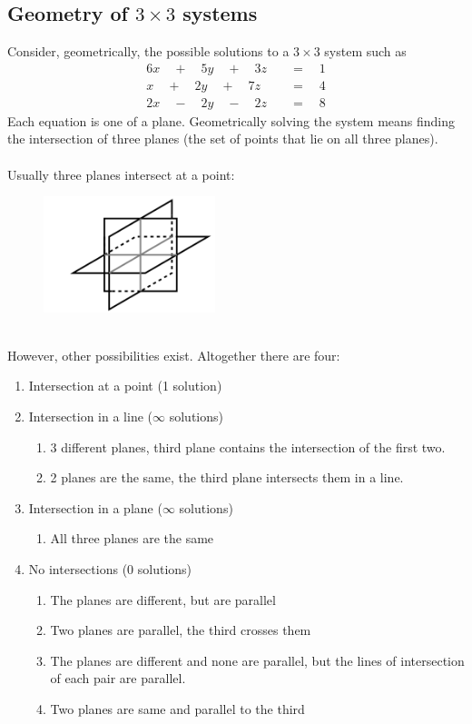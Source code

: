\documentclass{report}
\begin{document}
\subsection{Geometry of $3\times3$ systems} %
Consider, geometrically, the possible solutions to a $3\times3$ system such as
\begin{align*}
6x\quad+\quad5y\quad+\quad3z\quad&=\quad1\\
x\quad+\quad2y\quad+\quad7z\quad&=\quad4\\
2x\quad-\quad2y\quad-\quad2z\quad&=\quad8
\end{align*}
Each equation is one of a plane. Geometrically solving the system means finding the 
intersection of three planes (the set of points that
lie on all three planes).\\
\vspace{1mm}\\
Usually three planes intersect at a point:
\begin{figure}[h]
\includegraphics[width=5cm]{Capture85}\\
\centering
\end{figure}\\
However, other possibilities exist. Altogether there are four:
\begin{enumerate}
\item Intersection at a point (1 solution)
\item Intersection in a line ($\infty$ solutions)
\begin{enumerate}
\item 3 different planes, third plane contains the intersection of the first two.
\item 2 planes are the same, the third plane intersects them in a line.
\end{enumerate}
\item Intersection in a plane ($\infty$ solutions)
\begin{enumerate}
\item All three planes are the same
\end{enumerate}
\item No intersections (0 solutions)
\begin{enumerate}
\item The planes are different, but are parallel
\item Two planes are parallel, the third crosses them
\item The planes are different and none are parallel, but the lines of intersection 
of each pair are parallel.
\item Two planes are same and parallel to the third
\end{enumerate}
\end{enumerate}
\end{document}
